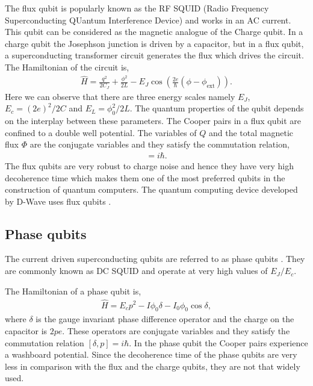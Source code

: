 \documentclass[twocolumn, aps, rmp, amsmath, amssymb, nofootinbib, superscriptaddress, longbibliography, floatfix, table-of-contents, eqsecnum]{revtex4-1}
\begin{document}
The flux qubit is popularly known as the RF SQUID (Radio Frequency Superconducting QUantum Interference Device) and works in an AC current. This qubit can be considered as the magnetic analogue of the Charge qubit. In a charge qubit the Josephson junction is driven by a capacitor, but in a flux qubit, a superconducting transformer circuit generates the flux which drives the circuit. The Hamiltonian of the circuit is,
\begin{align}
\hat{H} = \frac{q^{2}}{2 C_{J}} + \frac{\phi^{2}}{2 L} - E_{J} \cos \left( \frac{2e}{\hbar}(\phi - \phi_\mathrm{ext}) \right).
\end{align}
Here we can observe that there are three energy scales namely $E_{J}$, $E_{c} = (2e)^{2} / 2C$ and $E_{L} = \phi_{0}^{2} /2L$. The quantum properties of the qubit depends on the interplay between these parameters. The Cooper pairs in a flux qubit are confined to a double well potential. The variables of $Q$ and the total magnetic flux $\Phi$ are the conjugate variables and they satisfy the commutation relation,
\begin{align}
[\hat{Q},\hat\Phi] = i \hbar.
\end{align} 
The flux qubits are very robust to charge noise \cite{bib:you2005fast} and hence they have very high decoherence time which makes them one of the most preferred qubits in the construction of quantum computers. The quantum computing device developed by D-Wave uses flux qubits \cite{bib:harris2018phase}.

\subsection{Phase qubits}

The current driven superconducting qubits are referred to as phase qubits \cite{bib:martinis2002rabi}. They are commonly known as DC SQUID and operate at very high values of $E_{J}/E_{c}$.

The Hamiltonian of a phase qubit is,
\begin{align}
\hat{H} = E_{c} p^{2} - I \phi_{0} \delta - I_{0} \phi_{0} \cos \delta,
\label{eq:phase_qubit_hamiltonian}
\end{align}
where $\delta$ is the gauge invariant phase difference operator and the charge on the capacitor is $2pe$. These operators are conjugate variables and they satisfy the commutation relation $[\delta, p] = i \hbar$. In the phase qubit the Cooper pairs experience a washboard potential. Since the decoherence time of the phase qubits are very less in comparison with the flux and the charge qubits, they are not that widely used.
\end{document}
